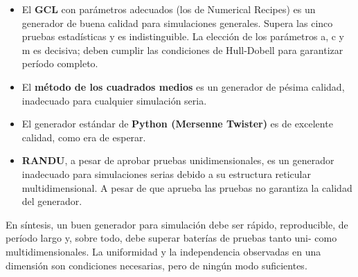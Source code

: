 \documentclass{article}
\begin{document}
\begin{itemize}
  \item El \textbf{GCL} con parámetros adecuados  (los de Numerical Recipes) es un generador de buena calidad para simulaciones generales. Supera las cinco pruebas estadísticas y es indistinguible. La elección de los parámetros a, c y m es decisiva; deben cumplir las condiciones de Hull-Dobell para garantizar período completo.
  \item El \textbf{método de los cuadrados medios} es un generador de pésima calidad, inadecuado para cualquier simulación seria.
  \item El generador estándar de \textbf{Python (Mersenne Twister)} es de excelente calidad, como era de esperar.
  \item \textbf{RANDU}, a pesar de aprobar pruebas unidimensionales, es un generador inadecuado para simulaciones serias debido a su estructura reticular multidimensional. A pesar de que aprueba las pruebas no garantiza la calidad del generador.
\end{itemize}

En síntesis, un buen generador para simulación debe ser rápido, reproducible, de período largo y, sobre todo, debe superar baterías de pruebas tanto uni- como multidimensionales.
La uniformidad y la independencia observadas en una dimensión son condiciones necesarias, pero de ningún modo
suficientes.






  


\renewcommand{\refname}{Bibliografía}
\end{document}
